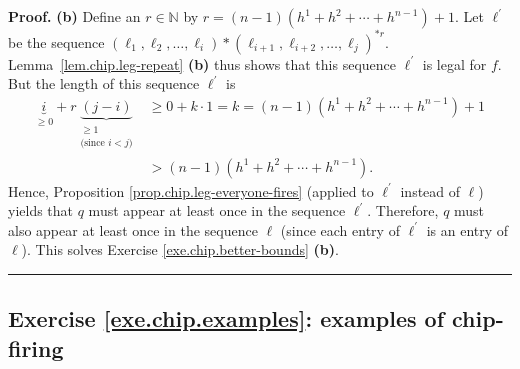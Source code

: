 \documentclass[numbers=enddot,12pt,final,onecolumn,notitlepage]{scrartcl}%
\theoremstyle{definition}
\newenvironment{proof}[1][Proof]{\noindent\textbf{#1.} }{\ \rule{0.5em}{0.5em}}
\newcommand{\NN}{\mathbb{N}}
\newcommand{\tup}[1]{\left( #1 \right)}
\begin{document}
\begin{proof}
\textbf{(b)} Define an $r \in \NN$ by
$r = \tup{n - 1} \tup{ h^1 + h^2 + \cdots + h^{n-1} } + 1$.
Let $\ell^{\prime}$ be the sequence
$\left(  \ell_{1}%
,\ell_{2},\ldots,\ell_{i}\right)  \ast\left(  \ell_{i+1},\ell_{i+2}%
,\ldots,\ell_{j}\right)  ^{\ast r}$.
Lemma~\ref{lem.chip.leg-repeat} \textbf{(b)} thus shows that
this sequence $\ell^\prime$ is legal for $f$.
But the length of this sequence $\ell^{\prime}$ is
\begin{align*}
\underbrace{i}_{\geq0}+r\underbrace{\left(  j-i\right)  }_{\substack{\geq
1\\\text{(since }i<j\text{)}}}  &  \geq0+k\cdot1=k=\left(  n-1\right)  \left(
h^1 + h^2 + \cdots + h^{n-1} \right)  +1\\
&  >\left(  n-1\right)  \left(  h^1 + h^2 + \cdots + h^{n-1} \right)  .
\end{align*}
Hence, Proposition \ref{prop.chip.leg-everyone-fires} (applied to
$\ell^{\prime}$ instead of $\ell$) yields that $q$ must appear at least once
in the sequence $\ell^{\prime}$. Therefore, $q$ must also appear at least once
in the sequence $\ell$ (since each entry of $\ell^{\prime}$ is an entry of
$\ell$). This solves Exercise \ref{exe.chip.better-bounds} \textbf{(b)}.
\end{proof}

\subsection{Exercise \ref{exe.chip.examples}: examples of chip-firing}
\end{document}
